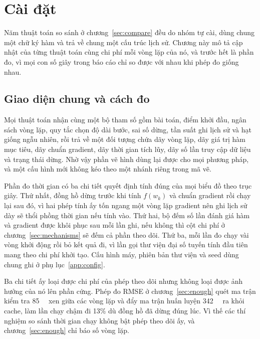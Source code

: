 \chapter{Cài đặt}
\label{sec:algorithms}

Năm thuật toán so sánh ở chương~\ref{sec:compare} đều do nhóm tự cài, dùng chung
một chữ ký hàm và trả về chung một cấu trúc lịch sử. Chương này mô tả cập nhật
của từng thuật toán cùng chi phí mỗi vòng lặp của nó, và trước hết là phần đo,
vì mọi con số giây trong báo cáo chỉ so được với nhau khi phép đo giống nhau.

\section{Giao diện chung và cách đo}
\label{sec:recorder}

Mọi thuật toán nhận cùng một bộ tham số gồm bài toán, điểm khởi đầu, ngân sách
vòng lặp, quy tắc chọn độ dài bước, sai số dừng, tần suất ghi lịch sử và hạt
giống ngẫu nhiên, rồi trả về một đối tượng chứa dãy vòng lặp, dãy giá trị hàm
mục tiêu, dãy chuẩn gradient, dãy thời gian tích lũy, dãy số lần truy cập dữ
liệu và trạng thái dừng. Nhờ vậy phần vẽ hình dùng lại được cho mọi phương pháp,
và một cấu hình mới không kéo theo một nhánh riêng trong mã vẽ.

Phần đo thời gian có ba chi tiết quyết định tính đúng của mọi biểu đồ theo trục
giây. Thứ nhất, đồng hồ dừng trước khi tính $f(w_k)$ và chuẩn gradient rồi chạy
lại sau đó, vì hai phép tính ấy tốn ngang một vòng lặp gradient nên ghi lịch sử
dày sẽ thổi phồng thời gian nếu tính vào. Thứ hai, bộ đếm số lần đánh giá hàm và
gradient được khôi phục sau mỗi lần ghi, nếu không thì cột chi phí ở
chương~\ref{sec:mechanisms} sẽ đếm cả phần theo dõi. Thứ ba, mỗi lần đo chạy vài
vòng khởi động rồi bỏ kết quả đi, vì lần gọi thư viện đại số tuyến tính đầu tiên
mang theo chi phí khởi tạo. Cấu hình máy, phiên bản thư viện và seed dùng chung
ghi ở phụ lục~\ref{app:config}.

Ba chi tiết ấy loại được chi phí của phép theo dõi nhưng không loại được ảnh
hưởng của nó lên phần cứng. Phép đo RMSE ở chương~\ref{sec:enough} quét ma trận
kiểm tra \SI{85}{\mebi\byte} xen giữa các vòng lặp và đẩy ma trận huấn luyện
\SI{342}{\mebi\byte} ra khỏi cache, làm lần chạy chậm đi 13\% dù đồng hồ đã dừng
đúng lúc. Vì thế các thí nghiệm so sánh thời gian chạy không bật phép theo dõi
ấy, và chương~\ref{sec:enough} chỉ báo số vòng lặp.

